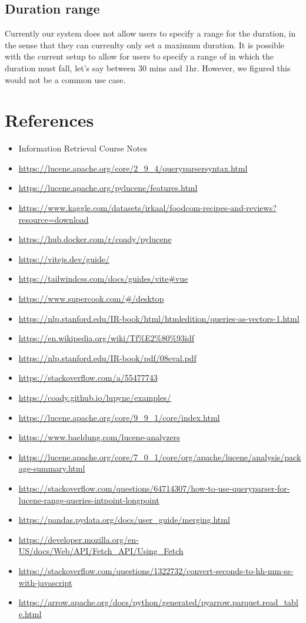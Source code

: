 \documentclass{article}
\begin{document}
\subsection{Duration range}
Currently our system does not allow users to specify a range for the duration,
in the sense that they can currenlty only set a maximum duration.
It is possible with the current setup to allow for users to specify a range of
in which the duration must fall, let's say between 30 mins and 1hr. However,
we figured this would not be a common use case.

\section{References}
\begin{itemize}
    \item Information Retrieval Course Notes
    \item \url{https://lucene.apache.org/core/2_9_4/queryparsersyntax.html}
    \item \url{https://lucene.apache.org/pylucene/features.html}
    \item \url{https://www.kaggle.com/datasets/irkaal/foodcom-recipes-and-reviews?resource=download}
    \item \url{https://hub.docker.com/r/coady/pylucene}
    \item \url{https://vitejs.dev/guide/}
    \item \url{https://tailwindcss.com/docs/guides/vite#vue}
    \item \url{https://www.supercook.com/#/desktop}
    \item \url{https://nlp.stanford.edu/IR-book/html/htmledition/queries-as-vectors-1.html}
    \item \url{https://en.wikipedia.org/wiki/Tf%E2%80%93idf}
    \item \url{https://nlp.stanford.edu/IR-book/pdf/08eval.pdf}
    \item \url{https://stackoverflow.com/a/55477743}
    \item \url{https://coady.github.io/lupyne/examples/}
    \item \url{https://lucene.apache.org/core/9_9_1/core/index.html}
    \item \url{https://www.baeldung.com/lucene-analyzers}
    \item \url{https://lucene.apache.org/core/7_0_1/core/org/apache/lucene/analysis/package-summary.html}
    \item \url{https://stackoverflow.com/questions/64714307/how-to-use-queryparser-for-lucene-range-queries-intpoint-longpoint}
    \item \url{https://pandas.pydata.org/docs/user_guide/merging.html}
    \item \url{https://developer.mozilla.org/en-US/docs/Web/API/Fetch_API/Using_Fetch}
    \item \url{https://stackoverflow.com/questions/1322732/convert-seconds-to-hh-mm-ss-with-javascript}
    \item \url{https://arrow.apache.org/docs/python/generated/pyarrow.parquet.read_table.html}
\end{itemize}
\end{document}
